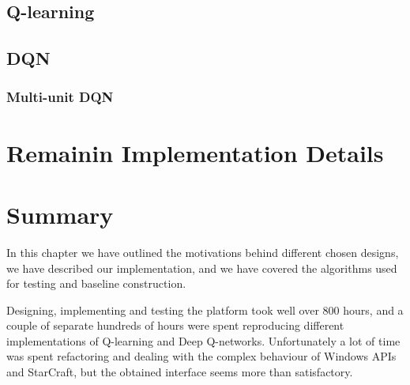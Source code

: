 \subsection{Q-learning}

\subsection{DQN}

\subsubsection{Multi-unit DQN}

\section{Remainin Implementation Details}

\section{Summary}

In this chapter we have outlined the motivations behind different chosen
designs, we have described our implementation, and we have covered the algorithms
used for testing and baseline construction.

Designing, implementing and testing the platform took well over 800 hours, and a
couple of separate hundreds of hours were spent reproducing different
implementations of Q-learning and Deep Q-networks. Unfortunately a lot of time
was spent refactoring and dealing with the complex behaviour of Windows APIs and
StarCraft, but the obtained interface seems more than satisfactory.
